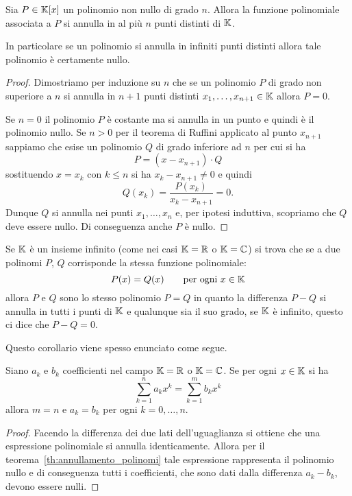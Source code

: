   \begin{theorem}
  \label{th:annullamento_polinomi}%
  Sia $P\in {\mathbb K}[x]$ un polinomio non nullo di grado $n$.
  Allora la funzione polinomiale associata a $P$
  si annulla in al più $n$ punti distinti di ${\mathbb K}$.
  
  In particolare se un polinomio si annulla in infiniti
  punti distinti allora tale polinomio è certamente nullo.
  \end{theorem}
  \begin{proof}
  Dimostriamo per induzione su $n$ che se un polinomio
  $P$ di grado non superiore a $n$ si annulla in $n+1$
  punti distinti $x_1, \dots, x_{n+1}\in {\mathbb K}$ allora
  $P=0$.
  
  Se $n=0$ il polinomio $P$ è costante ma si annulla
  in un punto e quindi è il polinomio nullo.
  Se $n>0$ per il teorema di Ruffini applicato al
  punto $x_{n+1}$ sappiamo che esise un polinomio $Q$
  di grado inferiore ad $n$ per cui si ha
  \[
    P = (x-x_{n+1}) \cdot Q
  \]
  sostituendo $x=x_k$ con $k\le n$ si ha $x_k-x_{n+1}\neq 0$
  e quindi
  \[
    Q(x_k) = \frac{P(x_k)}{x_k-x_{n+1}} = 0.
  \]
  Dunque $Q$ si annulla nei punti $x_1, \dots, x_n$
  e, per ipotesi induttiva, scopriamo che $Q$ deve
  essere nullo. Di conseguenza anche $P$ è nullo.
  \end{proof}
  
  Se ${\mathbb K}$ è un insieme infinito (come nei casi ${\mathbb K}={\mathbb R}$ o ${\mathbb K}={\mathbb C}$)
  si trova che
  se a due polinomi $P$, $Q$ corrisponde
  la stessa funzione polinomiale:
  \[
    P(x) = Q(x) \qquad \text{per ogni $x\in {\mathbb K}$}
  \]
  allora $P$ e $Q$ sono lo stesso polinomio $P=Q$
  in quanto la differenza $P-Q$ si annulla in tutti i punti
  di ${\mathbb K}$ e qualunque sia il suo grado, se ${\mathbb K}$ è infinito,
  questo ci dice che $P-Q=0$. 
  
  Questo corollario viene spesso enunciato come segue.
  \begin{theorem}
    Siano $a_k$ e $b_k$ coefficienti nel campo ${\mathbb K}={\mathbb R}$ o ${\mathbb K}={\mathbb C}$.
    Se per ogni $x\in {\mathbb K}$ si ha 
    \[
       \sum_{k=1}^n a_k x^k = \sum_{k=1}^m b_k x^k
    \]
    allora $m=n$ e $a_k=b_k$ per ogni $k=0, \dots, n$.
  \end{theorem}
  \begin{proof}
  Facendo la differenza dei due lati dell'uguaglianza si ottiene 
  che una espressione polinomiale si annulla identicamente. 
  Allora per il teorema~\ref{th:annullamento_polinomi} tale espressione 
  rappresenta il polinomio nullo e di conseguenza tutti i coefficienti, 
  che sono dati dalla differenza $a_k-b_k$, devono essere nulli.
  \end{proof}
  
